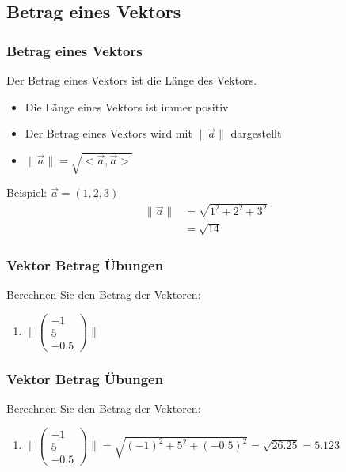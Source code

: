 \subsection{Betrag eines Vektors}
\begin{frame}
    \frametitle{Betrag eines Vektors}
    Der Betrag eines Vektors ist die Länge des Vektors.
    \begin{itemize}
        \item Die Länge eines Vektors ist immer positiv
        \item Der Betrag eines Vektors wird mit $\lVert \vec{a} \rVert$ dargestellt
        \item $\lVert \vec{a} \rVert = \sqrt{<\vec{a}, \vec{a}>}$
    \end{itemize}
    Beispiel: $\vec{a} = (1,2,3)$
    \begin{align*}
        \lVert \vec{a} \rVert &= \sqrt{1^2 + 2^2 + 3^2} \\
        &= \sqrt{14}
    \end{align*}
\end{frame}

\begin{frame}
    \frametitle{Vektor Betrag Übungen}
    Berechnen Sie den Betrag der Vektoren:
    \begin{enumerate}
        \item $\lVert \begin{pmatrix}
                          -1 \\ 5 \\ -0.5
        \end{pmatrix} \rVert$
    \end{enumerate}
\end{frame}

\begin{frame}
    \frametitle{Vektor Betrag Übungen}
    Berechnen Sie den Betrag der Vektoren:
    \begin{enumerate}
        \item $\lVert \begin{pmatrix}
                          -1 \\ 5 \\ -0.5
       \end{pmatrix} \rVert = \sqrt{(-1)^2 + 5^2 + (-0.5)^2} = \sqrt{26.25} = 5.123$
    \end{enumerate}
\end{frame}

